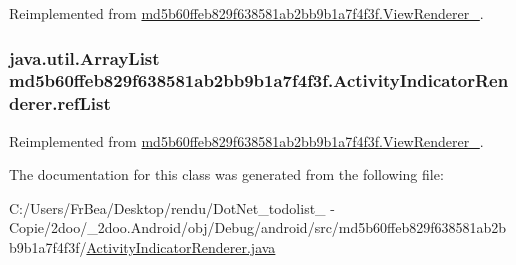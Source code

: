 Reimplemented from \hyperlink{classmd5b60ffeb829f638581ab2bb9b1a7f4f3f_1_1_view_renderer__2_80b609e3e4054c380887d4dc2907a875}{md5b60ffeb829f638581ab2bb9b1a7f4f3f.ViewRenderer\_}.\hypertarget{classmd5b60ffeb829f638581ab2bb9b1a7f4f3f_1_1_activity_indicator_renderer_d465ebc26140c383de6a0a2f34b1deb4}{
\subsubsection[{refList}]{\setlength{\rightskip}{0pt plus 5cm}java.util.ArrayList {\bf md5b60ffeb829f638581ab2bb9b1a7f4f3f.ActivityIndicatorRenderer.refList}}}
\label{classmd5b60ffeb829f638581ab2bb9b1a7f4f3f_1_1_activity_indicator_renderer_d465ebc26140c383de6a0a2f34b1deb4}




Reimplemented from \hyperlink{classmd5b60ffeb829f638581ab2bb9b1a7f4f3f_1_1_view_renderer__2_6c151401977148a92c515e9c7de1aaf8}{md5b60ffeb829f638581ab2bb9b1a7f4f3f.ViewRenderer\_}.

The documentation for this class was generated from the following file:\begin{CompactItemize}
\item 
C:/Users/FrBea/Desktop/rendu/DotNet\_\-todolist\_ - Copie/2doo/\_\-2doo.Android/obj/Debug/android/src/md5b60ffeb829f638581ab2bb9b1a7f4f3f/\hyperlink{_activity_indicator_renderer_8java}{ActivityIndicatorRenderer.java}\end{CompactItemize}
